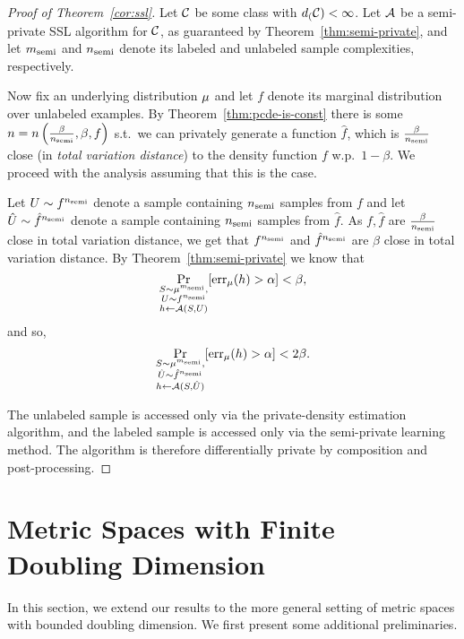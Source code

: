 \documentclass[12pt,a4paper,oneside,onecolumn]{book}
\begin{document}
\begin{proof}[Proof of Theorem~\ref{cor:ssl}]
Let $\mathcal{C}$ be some class with 
$d_{(}\mathcal{C})<\infty$. Let $\mathcal{A}$ be a semi-private SSL algorithm for $\mathcal{C}$, as guaranteed by Theorem~\ref{thm:semi-private}, and let $m_{\rm semi}$ and $n_{\rm semi}$ denote its labeled and unlabeled sample complexities, respectively.

Now fix an underlying distribution $\mu$ and let $f$ denote its marginal distribution over unlabeled examples. 
By Theorem~\ref{thm:pcde-is-const}
there is some $n = n\left(\frac{\beta}{n_{\rm semi}},\beta,f\right)$
s.t.\ we can privately generate a function $\hat{f}$, 
which is $\frac{\beta}{n_{\rm semi}}$ close (in \emph{total variation distance}) to the density function $f$ w.p.\ $1-\beta$. We proceed with the analysis assuming that this is the case.

Let $U\sim f^{n_{\rm semi}}$ denote a sample containing $n_{\rm semi}$ samples from $f$ and let $\hat{U}\sim\hat{f}^{n_{\rm semi}}$ denote a sample containing $n_{\rm semi}$ samples from $\hat{f}$. As $f,\hat{f}$ are $\frac{\beta}{n_{\rm semi}}$ close in total variation distance, we get that $f^{n_{\rm semi}}$ and $\hat{f}^{n_{\rm semi}}$ are $\beta$ close in total variation distance. 
By Theorem~\ref{thm:semi-private} we know that
$$
\Pr_{\substack{S\sim\mu^{m_{\rm semi}},\\U\sim f^{n_{\rm semi}}\\h\leftarrow\mathcal{A}(S,U)}}[\operatorname{err}_{\mu}(h)>\alpha]<\beta,
$$
and so,
$$
\Pr_{\substack{S\sim\mu^{m_{\rm semi}},\\\hat{U}\sim \hat{f}^{n_{\rm semi}}\\h\leftarrow\mathcal{A}(S,\hat{U})}}[\operatorname{err}_{\mu}(h)>\alpha]<2\beta.
$$

The unlabeled sample is accessed only via the private-density estimation algorithm,
and the labeled sample is accessed only via the semi-private learning method. The algorithm is therefore differentially private by composition and post-processing.
\end{proof}












\section{Metric Spaces with Finite Doubling Dimension}
\label{sec:doubling}
In this section, we extend our results to the more general setting of metric spaces with bounded doubling dimension. We first present some additional preliminaries.
\end{document}
